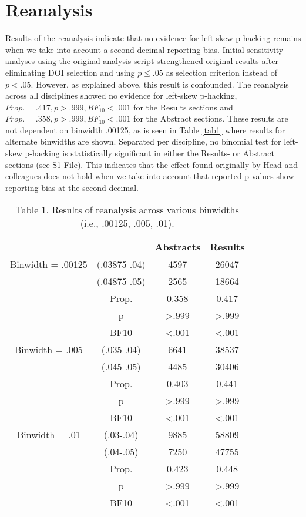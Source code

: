\section*{Reanalysis}
Results of the reanalysis indicate that no evidence for left-skew p-hacking remains when we take into account a second-decimal reporting bias. Initial sensitivity analyses using the original analysis script strengthened original results after eliminating DOI selection and using $p\leq.05$ as selection criterion instead of $p<.05$. However, as explained above, this result is confounded. The reanalysis across all disciplines showed no evidence for left-skew p-hacking, $Prop.=.417,p>.999, BF_{10}<.001$ for the Results sections and $Prop.=.358,p>.999,BF_{10}<.001$ for the Abstract sections. These results are not dependent on binwidth .00125, as is seen in Table \ref{tab1} where results for alternate binwidths are shown.  Separated per discipline, no binomial test for left-skew p-hacking is statistically significant in either the Results- or Abstract sections (see S1 File). This indicates that the effect found originally by Head and colleagues does not hold when we take into account that reported p-values show reporting bias at the second decimal.

\begin{table}[htbp]
    \begin{tabular}{cccc}
              &       & Abstracts & Results \\
              \hline
      Binwidth = .00125 & (.03875-.04) & 4597  & 26047 \\
          & (.04875-.05) & 2565  & 18664 \\
          & Prop. & 0.358 & 0.417 \\
          & p     & >.999 & >.999 \\
          & BF10  & <.001 & <.001 \\
    Binwidth = .005 & (.035-.04) & 6641  & 38537 \\
          & (.045-.05) & 4485  & 30406 \\
          & Prop. & 0.403 & 0.441 \\
          & p     & >.999 & >.999 \\
          & BF10  & <.001 & <.001 \\
    Binwidth = .01 & (.03-.04) & 9885  & 58809 \\
          & (.04-.05) & 7250  & 47755 \\
          & Prop. & 0.423 & 0.448 \\
          & p     & >.999 & >.999 \\
          & BF10  & <.001 & <.001 \\

    \end{tabular}
    \caption{Table 1. Results of reanalysis across various binwidths (i.e., .00125, .005, .01).} 
\end{table}
  
